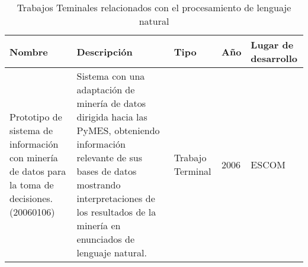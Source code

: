\begin{center}
\begin{table}[h]
\begin{tabular}{|p{35mm}|p{65mm}|l|l|p{25mm}|}
\hline
Nombre & Descripci\'on & Tipo & A\~no & Lugar de desarrollo \\
\hline
Prototipo de sistema de información con minería de datos para la toma de decisiones.
(20060106) & Sistema con una adaptación de minería de datos dirigida hacia las PyMES, obteniendo información relevante de sus bases de datos mostrando interpretaciones de los resultados de la minería en enunciados de lenguaje natural. & Trabajo Terminal & 2006 & ESCOM \\
\hline

\end{tabular}
\label{table:tabla2}
\caption{Trabajos Teminales relacionados con el procesamiento de lenguaje natural}
\end{table}
\end{center}

